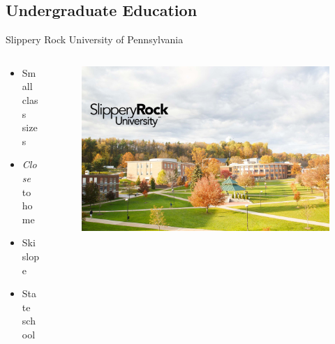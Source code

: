 \documentclass{beamer}
\begin{document}
\subsection{Undergraduate Education}
\begin{frame}{Slippery Rock University of Pennsylvania}
	\begin{columns}
		\begin{column}{.34\textwidth}
			\begin{itemize}
				\item Small class sizes
				\item \emph{Close} to home
				\item Ski slope
				\item State school
			\end{itemize}
		\end{column}
		\begin{column}{.66\textwidth}
			\begin{figure}
				\includegraphics[width=\linewidth]{img/sru.jpg}
			\end{figure}
		\end{column}
	\end{columns}
\end{frame}
\end{document}
